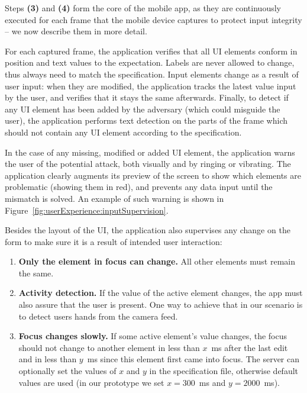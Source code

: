 Steps \textbf{(3)} and \textbf{(4)} form the core of the \name mobile app, as they are continuously executed for each frame that the mobile device captures to protect input integrity -- we now describe them in more detail.


For each captured frame, the application verifies that all UI elements conform in position and text values to the expectation.
Labels are never allowed to change, thus always need to match the specification.
Input elements change as a result of user input: when they are modified, the application tracks the latest value input by the user, and verifies that it stays the same afterwards.
Finally, to detect if any UI element has been added by the adversary (which could misguide the user), the application performs text detection on the parts of the frame which should not contain any UI element according to the specification.

In the case of any missing, modified or added UI element, the application warns the user of the potential attack, both visually and by ringing or vibrating.
The application clearly augments its preview of the screen to show which elements are problematic (showing them in red), and prevents any data input until the mismatch is solved.
An example of such warning is shown in Figure~\ref{fig:userExperience:inputSupervision}.


Besides the layout of the UI, the application also supervises any change on the form to make sure it is a result of intended user interaction:

\begin{enumerate} [label=(\alph*), leftmargin=*]
    \item \textbf{Only the element in focus can change.}
    All other elements must remain the same.
    \item \textbf{Activity detection.}
    If the value of the active element changes, the app must also assure that the user is present. One way to achieve that in our scenario is to detect users hands from the camera feed.
    \item \textbf{Focus changes slowly.}
    If some active element's value changes, the focus should not change to another element in less than $x$~ms after the last edit and in less than $y$~ms since this element first came into focus.
    The server can optionally set the values of $x$ and $y$ in the specification file, otherwise default values are used (in our prototype we set $x=300$~ms and $y=2000$~ms).


\end{enumerate}


